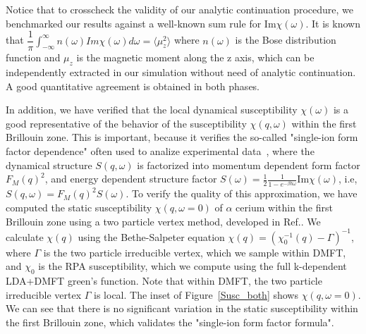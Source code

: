 \documentclass[10pt]{ruthesis}
\begin{document}
{Notice that to crosscheck the validity of our analytic continuation
procedure, we benchmarked our results against a well-known sum rule
for Im$\chi(\omega)$. It is known that
$\dfrac{1}{\pi}\int_{-\infty}^{\infty} n(\omega)Im\chi(\omega) d\omega
= \langle \mu_{z}^{2} \rangle$ where $n(\omega)$ is the Bose
distribution function and $\mu_{z}$ is the magnetic moment along the z
axis, which can be independently extracted in our simulation without
need of analytic continuation.  A good quantitative agreement is
obtained in both phases.




In addition, we have verified that the local dynamical susceptibility
$\chi(\omega)$ is a good representative of the behavior of the
susceptibility $\chi(q,\omega)$ within the first Brillouin zone.  This
is important, because it verifies the so-called "single-ion form
factor dependence" often used to analize experimental
data~\cite{murani}, where the dynamical structure $S(q,\omega)$ is
factorized into momentum dependent form factor $F_M(q)^2$, and
energy dependent structure factor
$S(\omega)=\frac{1}{2}\frac{1}{1-e^{-\beta\hbar\omega}}$Im$\chi(\omega)$,
i.e, $S(q,\omega) = F_M(q)^2 S(\omega)$.  To verify the quality of
this approximation, we have computed the static susceptibility
$\chi(q, \omega=0)$ of $\alpha$ cerium within the first Brillouin zone
using a two particle vertex method, developed in
Ref.\cite{Park_prl11}.  We calculate $\chi(q)$ using the
Bethe-Salpeter equation $\chi(q)= (\chi_{0}^{-1}(q)-\Gamma)^{-1}$,
where $\Gamma$ is the two particle irreducible vertex, which we sample
within DMFT, and $\chi_0$ is the RPA susceptibility, which we compute
using the full k-dependent LDA+DMFT green's function. Note that within
DMFT, the two particle irreducible vertex $\Gamma$ is local. The inset
of Figure~\ref{Susc_both} shows $\chi(q, \omega=0)$. We can see that
there is no significant variation in the static susceptibility within
the first Brillouin zone, which validates the "single-ion form factor
formula".
%
\begin{figure}[t]
\end{figure}}
\end{document}
